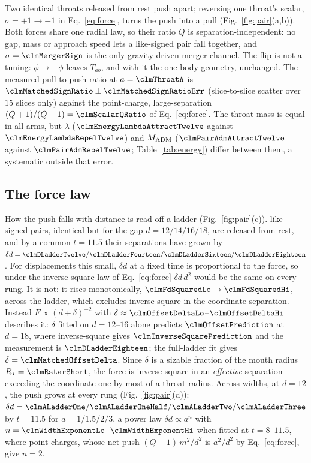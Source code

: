 \documentclass[twocolumn,floatfix,aps,prd,superscriptaddress,nofootinbib]{revtex4-2}
\begin{document}
Two identical throats released from rest push apart; reversing one throat's scalar, $\sigma=+1\to-1$ in Eq.~\eqref{eq:force}, turns the push into a pull (Fig.~\ref{fig:pair}(a,b)). Both forces share one radial law, so their ratio $Q$ is separation-independent: no gap, mass or approach speed lets a like-signed pair fall together, and $\sigma=\clmMergerSign$ is the only gravity-driven merger channel. The flip is not a tuning: $\phi\to-\phi$ leaves $T_{ab}$, and with it the one-body geometry, unchanged. The measured pull-to-push ratio at $a=\clmThroatA$ is $\clmMatchedSignRatio\pm\clmMatchedSignRatioErr$ (slice-to-slice scatter over $15$ slices only) against the point-charge, large-separation $(Q+1)/(Q-1)=\clmScalarQRatio$ of Eq.~\eqref{eq:force}. The throat mass is equal in all arms, but $\lambda$ ($\clmEnergyLambdaAttractTwelve$ against $\clmEnergyLambdaRepelTwelve$) and $M_{\rm ADM}$ ($\clmPairAdmAttractTwelve$ against $\clmPairAdmRepelTwelve$; Table~\ref{tab:energy}) differ between them, a systematic outside that error.

\subsection{The force law}
\label{sec:pair:force}

How the push falls with distance is read off a ladder (Fig.~\ref{fig:pair}(c)). \clmCountLikeSignedPairs{} like-signed pairs, identical but for the gap $d=12/14/16/18$, are released from rest, and by a common $t=11.5$ their separations have grown by $\delta d=\clmDLadderTwelve/\clmDLadderFourteen/\clmDLadderSixteen/\clmDLadderEighteen$. For displacements this small, $\delta d$ at a fixed time is proportional to the force, so under the inverse-square law of Eq.~\eqref{eq:force} $\delta d\,d^2$ would be the same on every rung. It is not: it rises monotonically, $\clmFdSquaredLo\to\clmFdSquaredHi$, across the ladder, which excludes inverse-square in the coordinate separation. Instead $F\propto(d+\delta)^{-2}$ with $\delta\approx\clmOffsetDeltaLo$--$\clmOffsetDeltaHi$ describes it: $\delta$ fitted on $d=12$--$16$ alone predicts $\clmOffsetPrediction$ at $d=18$, where inverse-square gives $\clmInverseSquarePrediction$ and the measurement is $\clmDLadderEighteen$; the full-ladder fit gives $\delta=\clmMatchedOffsetDelta$. Since $\delta$ is a sizable fraction of the mouth radius $R_\star=\clmRstarShort$, the force is inverse-square in an \emph{effective} separation exceeding the coordinate one by most of a throat radius. Across widths, at $d=12$, the push grows at every rung (Fig.~\ref{fig:pair}(d)): $\delta d=\clmALadderOne/\clmALadderOneHalf/\clmALadderTwo/\clmALadderThree$ by $t=11.5$ for $a=1/1.5/2/3$, a power law $\delta d\propto a^n$ with $n=\clmWidthExponentLo$--$\clmWidthExponentHi$ when fitted at $t=8$--$11.5$, where point charges, whose net push $(Q-1)\,m^2/d^2$ is $a^2/d^2$ by Eq.~\eqref{eq:force}, give $n=2$.
\end{document}
